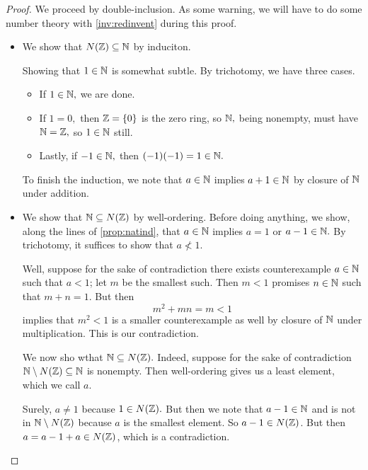 \documentclass{article}
\begin{document}
\begin{proof}
	We proceed by double-inclusion. As some warning, we will have to do some number theory with \autoref{inv:redinvent} during this proof.
	\begin{itemize}
		\item We show that $N(\mathbb Z)\subseteq\mathbb N$ by induciton.

		Showing that $1\in\mathbb N$ is somewhat subtle. By trichotomy, we have three cases.
		\begin{itemize}
			\item If $1\in\mathbb N,$ we are done.
			\item If $1=0,$ then $\mathbb Z=\{0\}$ is the zero ring, so $\mathbb N,$ being nonempty, must have $\mathbb N=\mathbb Z,$ so $1\in\mathbb N$ still.
			\item Lastly, if $-1\in\mathbb N,$ then $(-1)(-1)=1\in\mathbb N.$
		\end{itemize}
		To finish the induction, we note that $a\in\mathbb N$ implies $a+1\in\mathbb N$ by closure of $\mathbb N$ under addition.
		\item We show that $\mathbb N\subseteq N(\mathbb Z)$ by well-ordering. Before doing anything, we show, along the lines of \autoref{prop:natind}, that $a\in\mathbb N$ implies $a=1$ or $a-1\in\mathbb N.$ By trichotomy, it suffices to show that $a\not<1.$
		
		Well, suppose for the sake of contradiction there exists counterexample $a\in\mathbb N$ such that $a<1$; let $m$ be the smallest such. Then $m<1$ promises $n\in\mathbb N$ such that $m+n=1.$ But then
		\[m^2+mn=m<1\]
		implies that $m^2<1$ is a smaller counterexample as well by closure of $\mathbb N$ under multiplication. This is our contradiction.
		
		We now sho wthat $\mathbb N\subseteq N(\mathbb Z).$ Indeed, suppose for the sake of contradiction $\mathbb N\setminus N(\mathbb Z)\subseteq\mathbb N$ is nonempty. Then well-ordering gives us a least element, which we call $a.$

		Surely, $a\ne1$ because $1\in N(\mathbb Z).$ But then we note that $a-1\in\mathbb N$ and is not in $\mathbb N\setminus N(\mathbb Z)$ because $a$ is the smallest element. So $a-1\in N(\mathbb Z)$. But then $a=a-1+a\in N(\mathbb Z)$, which is a contradiction.
		\qedhere
	\end{itemize}
\end{proof}
\end{document}
